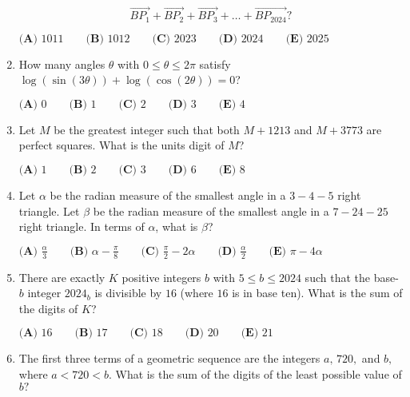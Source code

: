 \documentclass{article}
\begin{document}
\begin{enumerate}[label=\arabic*., itemsep=0.5em]
\begin{equation*}
\overrightarrow{BP_1} + \overrightarrow{BP_2} + \overrightarrow{BP_3} + \dots + \overrightarrow{BP_{2024}}?
\end{equation*}

\(
\textbf{(A) }1011 \qquad
\textbf{(B) }1012 \qquad
\textbf{(C) }2023 \qquad
\textbf{(D) }2024 \qquad
\textbf{(E) }2025 \qquad
\)\par \vspace{0.5em}\item How many angles \(\theta\) with \(0\le\theta\le2\pi\) satisfy \(\log(\sin(3\theta))+\log(\cos(2\theta))=0\)?  

\( \textbf{(A) }0 \qquad \textbf{(B) }1 \qquad \textbf{(C) }2 \qquad \textbf{(D) }3 \qquad \textbf{(E) }4 \qquad \)\par \vspace{0.5em}\item Let \(M\) be the greatest integer such that both \(M + 1213\) and \(M + 3773\) are perfect squares. What is the units digit of \(M\)?

\(
\textbf{(A) }1 \qquad
\textbf{(B) }2 \qquad
\textbf{(C) }3 \qquad
\textbf{(D) }6 \qquad
\textbf{(E) }8 \qquad
\)\par \vspace{0.5em}\item Let \(\alpha\) be the radian measure of the smallest angle in a \(3{-}4{-}5\) right triangle. Let \(\beta\) be the radian measure of the smallest angle in a \(7{-}24{-}25\) right triangle. In terms of \(\alpha\), what is \(\beta\)?

\(
\textbf{(A) }\frac{\alpha}{3}\qquad
\textbf{(B) }\alpha - \frac{\pi}{8}\qquad
\textbf{(C) }\frac{\pi}{2} - 2\alpha \qquad
\textbf{(D) }\frac{\alpha}{2}\qquad
\textbf{(E) }\pi - 4\alpha\qquad
\)\par \vspace{0.5em}\item There are exactly \(K\) positive integers \(b\) with \(5 \leq b \leq 2024\) such that the base-\(b\) integer \(2024_b\) is divisible by \(16\) (where \(16\) is in base ten). What is the sum of the digits of \(K\)?

\(\textbf{(A) }16\qquad\textbf{(B) }17\qquad\textbf{(C) }18\qquad\textbf{(D) }20\qquad\textbf{(E) }21\)\par \vspace{0.5em}\item The first three terms of a geometric sequence are the integers \(a,\,720,\) and \(b,\) where \(a<720<b.\) What is the sum of the digits of the least possible value of \(b?\)


\end{enumerate}
\end{document}
